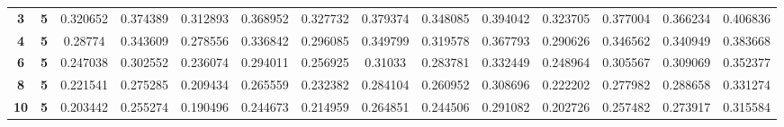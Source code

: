 \begin{sidewaystable}[!p]
\begin{threeparttable}
\begin{tabular}{>{\bfseries}c>{\bfseries}cSSSSSSSSSSSS}
			3    & 5   & 0.320652   & 0.374389 & 0.312893   & 0.368952 & 0.327732   & 0.379374 & 0.348085   & 0.394042 & 0.323705   & 0.377004 & 0.366234   & 0.406836 \\
			4    & 5   & 0.28774    & 0.343609 & 0.278556   & 0.336842 & 0.296085   & 0.349799 & 0.319578   & 0.367793 & 0.290626   & 0.346562 & 0.340949   & 0.383668 \\
			6    & 5   & 0.247038   & 0.302552 & 0.236074   & 0.294011 & 0.256925   & 0.31033  & 0.283781   & 0.332449 & 0.248964   & 0.305567 & 0.309069   & 0.352377 \\
			8    & 5   & 0.221541   & 0.275285 & 0.209434   & 0.265559 & 0.232382   & 0.284104 & 0.260952   & 0.308696 & 0.222202   & 0.277982 & 0.288658   & 0.331274 \\
			10   & 5   & 0.203442   & 0.255274 & 0.190496   & 0.244673 & 0.214959   & 0.264851 & 0.244506   & 0.291082 & 0.202726   & 0.257482 & 0.273917   & 0.315584 \\ \bottomrule
		\end{tabular}
	\end{threeparttable}

	\bigskip\bigskip  %


\end{sidewaystable}
